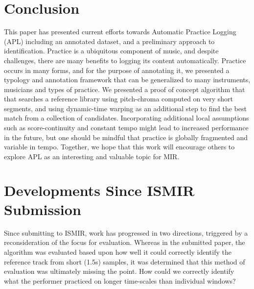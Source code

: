 \documentclass{article}
\begin{document}




\section{Conclusion}
This paper has presented current efforts towards Automatic Practice Logging (APL) including an annotated dataset, and a preliminary approach to identification.  Practice is a ubiquitous component of music, and despite challenges, there are many benefits to logging its content automatically. Practice occurs in many forms, and for the purpose of annotating it, we presented a typology and annotation framework that can be generalized to many instruments, musicians and types of practice.  We presented a proof of concept algorithm that that searches a reference library using pitch-chroma computed on very short segments, and using dynamic-time warping as an additional step to find the best match from a collection of candidates. Incorporating additional local assumptions such as score-continuity and constant tempo might lead to increased performance in the future, but one should be mindful that practice is globally fragmented and variable in tempo. Together, we hope that this work will encourage others to explore APL as an interesting and valuable topic for MIR.     


\section{Developments Since ISMIR Submission}

Since submitting to ISMIR, work has progressed in two directions, triggered by a reconsideration of the focus for evaluation. Whereas in the submitted paper, the algorithm was evaluated based upon how well it could correctly identify the reference track from short (1.5s) samples, it was determined that this method of evaluation was ultimately missing the point. How could we correctly identify what the performer practiced on longer time-scales than individual windows?
\end{document}
